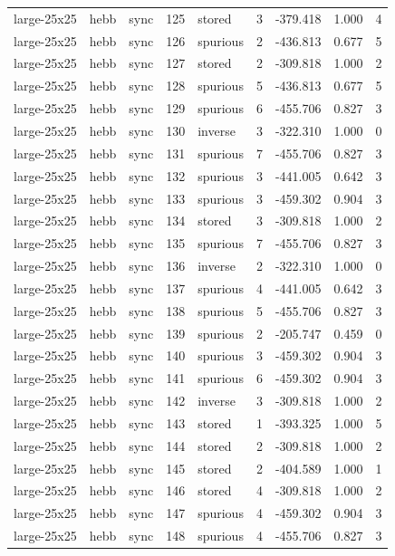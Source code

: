 \begin{tabular}{lllrlrrrr}
large-25x25 & hebb & sync & 125 & stored & 3 & -379.418 & 1.000 & 4 \\
large-25x25 & hebb & sync & 126 & spurious & 2 & -436.813 & 0.677 & 5 \\
large-25x25 & hebb & sync & 127 & stored & 2 & -309.818 & 1.000 & 2 \\
large-25x25 & hebb & sync & 128 & spurious & 5 & -436.813 & 0.677 & 5 \\
large-25x25 & hebb & sync & 129 & spurious & 6 & -455.706 & 0.827 & 3 \\
large-25x25 & hebb & sync & 130 & inverse & 3 & -322.310 & 1.000 & 0 \\
large-25x25 & hebb & sync & 131 & spurious & 7 & -455.706 & 0.827 & 3 \\
large-25x25 & hebb & sync & 132 & spurious & 3 & -441.005 & 0.642 & 3 \\
large-25x25 & hebb & sync & 133 & spurious & 3 & -459.302 & 0.904 & 3 \\
large-25x25 & hebb & sync & 134 & stored & 3 & -309.818 & 1.000 & 2 \\
large-25x25 & hebb & sync & 135 & spurious & 7 & -455.706 & 0.827 & 3 \\
large-25x25 & hebb & sync & 136 & inverse & 2 & -322.310 & 1.000 & 0 \\
large-25x25 & hebb & sync & 137 & spurious & 4 & -441.005 & 0.642 & 3 \\
large-25x25 & hebb & sync & 138 & spurious & 5 & -455.706 & 0.827 & 3 \\
large-25x25 & hebb & sync & 139 & spurious & 2 & -205.747 & 0.459 & 0 \\
large-25x25 & hebb & sync & 140 & spurious & 3 & -459.302 & 0.904 & 3 \\
large-25x25 & hebb & sync & 141 & spurious & 6 & -459.302 & 0.904 & 3 \\
large-25x25 & hebb & sync & 142 & inverse & 3 & -309.818 & 1.000 & 2 \\
large-25x25 & hebb & sync & 143 & stored & 1 & -393.325 & 1.000 & 5 \\
large-25x25 & hebb & sync & 144 & stored & 2 & -309.818 & 1.000 & 2 \\
large-25x25 & hebb & sync & 145 & stored & 2 & -404.589 & 1.000 & 1 \\
large-25x25 & hebb & sync & 146 & stored & 4 & -309.818 & 1.000 & 2 \\
large-25x25 & hebb & sync & 147 & spurious & 4 & -459.302 & 0.904 & 3 \\
large-25x25 & hebb & sync & 148 & spurious & 4 & -455.706 & 0.827 & 3 \\

\end{tabular}
